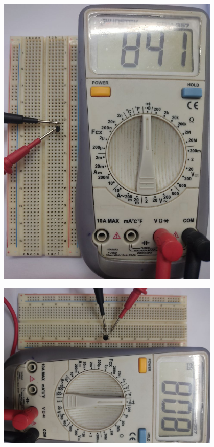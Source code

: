 \documentclass[12pt]{article}
\begin{document}
\vspace{40pt}
\begin{minipage}{0.45\textwidth}
    \centering
    \includegraphics[width=0.8\textwidth]{npn.jpg}
\end{minipage}\hspace{30pt}
\begin{minipage}{0.45\textwidth}
    \centering
    \includegraphics[angle=90, width=0.8\textwidth]{pnp.jpg}
\end{minipage}
\end{document}
